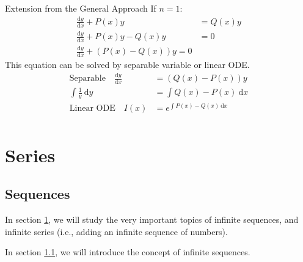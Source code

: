 \documentclass[12pt,a4paper]{article}
\def\d{{\mathrm{d}}}
\def\dydx{\frac{\d y}{\d x}}
\def\dx{\d x}
\begin{document}
\begin{ext}{Extension from the General Approach}
	If $n=1$: 
	$$\begin{aligned}
		\dydx+P(x)y&=Q(x)y\\
		\dydx+P(x)y-Q(x)y&=0\\
		\dydx+\left(P(x)-Q(x)\right)y=0
	\end{aligned}$$	
	This equation can be solved by separable variable or linear ODE.
	$$\begin{aligned}
		\boxed{\text{Separable}}\quad\dydx &=\left(Q(x)-P(x)\right)y\\
		\int\frac{1}{y}\ \d y&=\int Q(x)-P(x)\ \dx\\
		\boxed{\text{Linear ODE}}\quad I(x)&=e^{\int P(x)-Q(x)\ \dx}\\
	\end{aligned}$$
\end{ext}

\section{Series}\label{series}
\subsection{Sequences}\label{sequence}
In section \ref{series}, we will study the very important topics of infinite sequences, and infinite series (i.e., adding an infinite sequence of numbers).

In section \ref{sequence}, we will introduce the concept of infinite sequences. 
\end{document}

